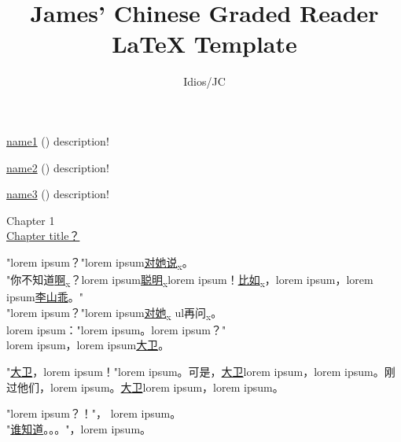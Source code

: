\documentclass{report}
\title{James' Chinese Graded Reader LaTeX Template}
\author{Idios/JC}
\begin{document}
	
\maketitle




\uline{name1} () description!

\uline{name2} () description!

\uline{name3} () description!

\clearpage


{\centering \LARGE
{Chapter 1}\\
{\uline{Chapter title？}}\\}




{\Large "lorem ipsum？"lorem ipsum\ul{\mbox{对她说}}\textsubscript{x}。\\
\indent "你不知道\ul{啊}\textsubscript{x}？lorem ipsum\ul{\mbox{聪明}}\textsubscript{x}lorem ipsum！\ul{\mbox{比如}}\textsubscript{x}，lorem ipsum，lorem ipsum\uline{李山乖}。"\\
\indent "lorem ipsum？"lorem ipsum\ul{\mbox{对她}}\textsubscript{x} ul{\mbox{再问}}\textsubscript{x}。\\
\indent lorem ipsum："lorem ipsum。lorem ipsum？"\\
\indent lorem ipsum，lorem ipsum\uline{大卫}。



\indent "\uline{大卫}，lorem ipsum！"lorem ipsum。可是，\uline{大卫}lorem ipsum，lorem ipsum。刚过他们，lorem ipsum。\uline{大卫}lorem ipsum，lorem ipsum。

\indent "lorem ipsum？！"， lorem ipsum。\\
\indent "\ul{\mbox{谁知道}}。。。"，lorem ipsum。} 
\end{document}
